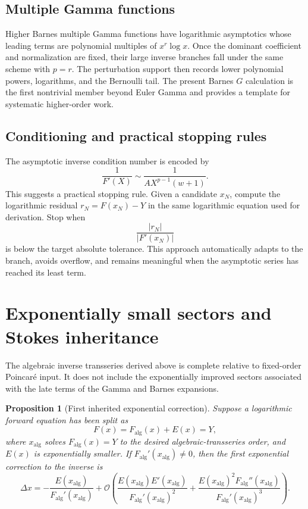 \documentclass[11pt]{article}
\newtheorem{proposition}[theorem]{Proposition}
\theoremstyle{definition}
\theoremstyle{remark}
\newcommand{\BigO}{\mathcal O}
\begin{document}
\subsection{Multiple Gamma functions}

Higher Barnes multiple Gamma functions have logarithmic asymptotics whose leading terms are polynomial multiples of \(x^r\log x\).  Once the dominant coefficient and normalization are fixed, their large inverse branches fall under the same scheme with \(p=r\).  The perturbation support then records lower polynomial powers, logarithms, and the Bernoulli tail.  The present Barnes \(G\) calculation is the first nontrivial member beyond Euler Gamma and provides a template for systematic higher-order work.

\subsection{Conditioning and practical stopping rules}

The asymptotic inverse condition number is encoded by
\[
 \frac{1}{F'(X)}\sim\frac{1}{A X^{p-1}(w+1)}.
\]
This suggests a practical stopping rule.  Given a candidate \(x_N\), compute the logarithmic residual \(r_N=F(x_N)-Y\) in the same logarithmic equation used for derivation.  Stop when
\[
 \frac{|r_N|}{|F'(x_N)|}
\]
is below the target absolute tolerance.  This approach automatically adapts to the branch, avoids overflow, and remains meaningful when the asymptotic series has reached its least term.

\section{Exponentially small sectors and Stokes inheritance}\label{sec:stokes}

The algebraic inverse transseries derived above is complete relative to fixed-order Poincar\'e input.  It does not include the exponentially improved sectors associated with the late terms of the Gamma and Barnes expansions.

\begin{proposition}[First inherited exponential correction]\label{prop:stokes-inheritance}
Suppose a logarithmic forward equation has been split as
\[
 F(x)=F_{\mathrm{alg}}(x)+E(x)=Y,
\]
where \(x_{\mathrm{alg}}\) solves \(F_{\mathrm{alg}}(x)=Y\) to the desired algebraic-transseries order, and \(E(x)\) is exponentially smaller.  If
\(F_{\mathrm{alg}}'(x_{\mathrm{alg}})\ne0\), then the first exponential correction to the inverse is
\begin{equation}\label{eq:first-exp-inverse}
 \Delta x
 =-\frac{E(x_{\mathrm{alg}})}{F_{\mathrm{alg}}'(x_{\mathrm{alg}})}
 +\BigO\!\left(
 \frac{E(x_{\mathrm{alg}})E'(x_{\mathrm{alg}})}{F_{\mathrm{alg}}'(x_{\mathrm{alg}})^2}
 +\frac{E(x_{\mathrm{alg}})^2F_{\mathrm{alg}}''(x_{\mathrm{alg}})}{F_{\mathrm{alg}}'(x_{\mathrm{alg}})^3}
 \right).
\end{equation}
\end{proposition}
\end{document}
